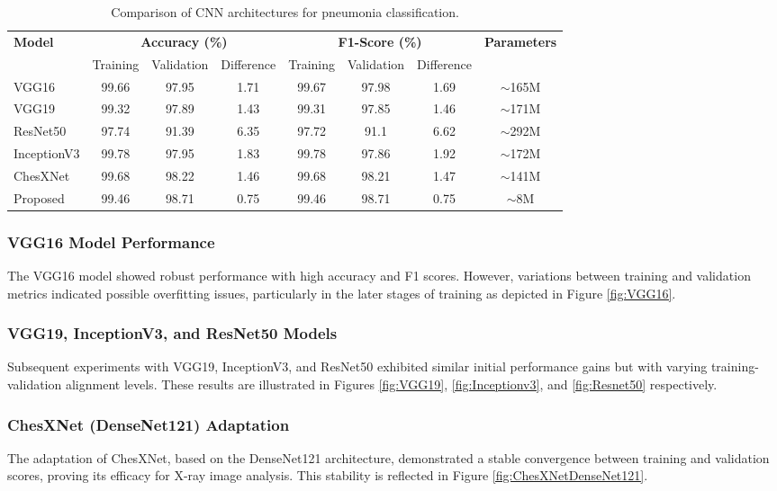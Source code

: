 \documentclass[10pt]{article}
\begin{document}
\begin{table}[H]
\centering
\setlength{\tabcolsep}{4pt} %
\begin{tabular}{lccccccc}
\toprule
\textbf{Model} & \multicolumn{3}{c}{\textbf{Accuracy (\%)}} & \multicolumn{3}{c}{\textbf{F1-Score (\%)}} & \textbf{Parameters} \\
\cmidrule(lr){2-4} \cmidrule(lr){5-7}
 & Training & Validation & Difference & Training & Validation & Difference & \\
\midrule
VGG16           & 99.66 & 97.95 & 1.71 & 99.67 & 97.98 & 1.69 & $\sim$165M \\
VGG19           & 99.32 & 97.89 & 1.43 & 99.31 & 97.85 & 1.46 & $\sim$171M \\
ResNet50        & 97.74 & 91.39 & 6.35 & 97.72 & 91.1  & 6.62 & $\sim$292M \\
InceptionV3     & 99.78 & 97.95 & 1.83 & 99.78 & 97.86 & 1.92 & $\sim$172M \\
ChesXNet & 99.68 & 98.22 & 1.46 & 99.68 & 98.21 & 1.47 & $\sim$141M \\
Proposed        & 99.46 & 98.71 & 0.75 & 99.46 & 98.71 & 0.75 & $\sim$8M \\
\bottomrule
\end{tabular}
\caption{Comparison of CNN architectures for pneumonia classification.}
\label{tab:model_performance}
\end{table}
\subsubsection{VGG16 Model Performance}
The VGG16 model showed robust performance with high accuracy and F1 scores. However, variations between training and validation metrics indicated possible overfitting issues, particularly in the later stages of training as depicted in Figure \ref{fig:VGG16}.

\subsubsection{VGG19, InceptionV3, and ResNet50 Models}
Subsequent experiments with VGG19, InceptionV3, and ResNet50 exhibited similar initial performance gains but with varying training-validation alignment levels. These results are illustrated in Figures \ref{fig:VGG19}, \ref{fig:Inceptionv3}, and \ref{fig:Resnet50} respectively.

\subsubsection{ChesXNet (DenseNet121) Adaptation}
The adaptation of ChesXNet, based on the DenseNet121 architecture, demonstrated a stable convergence between training and validation scores, proving its efficacy for X-ray image analysis. This stability is reflected in Figure \ref{fig:ChesXNetDenseNet121}.
\end{document}

